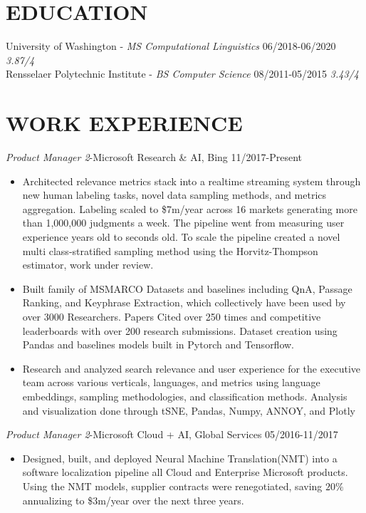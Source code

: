 \documentclass[line,margin]{res}
\begin{document}
\address{Seattle, WA (415)-272-9964 \href{mailto:dfcf93@hotmail.com}{dfcf93@hotmail.com}}
\begin{resume}
\section{EDUCATION}
University of Washington - {\sl MS Computational Linguistics} 06/2018-06/2020 {\sl 3.87/4} \\
Rensselaer Polytechnic Institute - {\sl BS Computer Science} 08/2011-05/2015  {\sl 3.43/4} \\      
\section{WORK EXPERIENCE} 
{\sl Product Manager 2}-Microsoft Research \& AI,  Bing  \hfill 11/2017-Present
\begin{itemize}  \itemsep -4pt 
\item Architected relevance metrics stack into a realtime streaming system through new human labeling tasks, novel data sampling methods, and metrics aggregation. Labeling scaled to \$7m/year across 16 markets generating more than 1,000,000 judgments a week. The pipeline went from measuring user experience years old to seconds old. To scale the pipeline created a novel multi class-stratified sampling method using the Horvitz-Thompson estimator, work under review.
\item  Built family of MSMARCO Datasets and baselines including QnA, Passage Ranking, and Keyphrase Extraction, which collectively have been used by over 3000 Researchers. Papers Cited over 250 times and competitive leaderboards with over 200 research submissions. Dataset creation using Pandas and baselines models built in Pytorch and Tensorflow.
\item Research and analyzed search relevance and user experience for the executive team across various verticals, languages, and metrics using language embeddings, sampling methodologies, and classification methods. Analysis and visualization done through tSNE, Pandas, Numpy, ANNOY, and Plotly
\end{itemize}
{\sl Product Manager 2}-Microsoft Cloud + AI, Global Services \hfill 05/2016-11/2017
\begin{itemize}  \itemsep -4pt
\item Designed, built, and deployed Neural Machine Translation(NMT) into a software localization pipeline all Cloud and Enterprise Microsoft products. Using the NMT models, supplier contracts were renegotiated, saving $20\%$ annualizing to \$3m/year over the next three years.

\end{itemize}
\end{resume}
\end{document}
